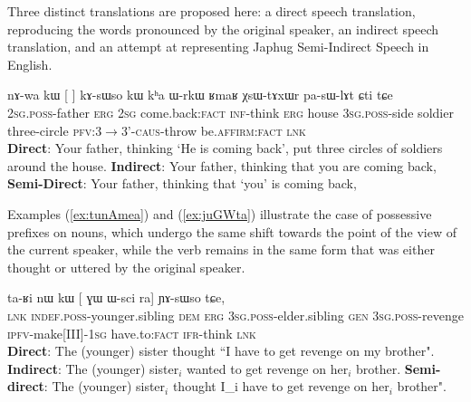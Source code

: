 \documentclass[oldfontcommands,oneside,a4paper,11pt]{article}
\newcommand{\ipa}[1]{{\phon \mbox{#1}}} %
\newcommand{\refb}[1]{(\ref{#1})}
\newcommand{\bleu}[1]{{\color{blue}#1}}
\newcommand{\rouge}[1]{{\color{red}#1}}
\begin{document}
Three distinct translations are proposed here: a direct speech translation, reproducing the words pronounced by the original speaker, an indirect speech translation, and an attempt at representing Japhug Semi-Indirect Speech in English.


\begin{exe}
\ex \label{ex:nWGi.kAsWso}
\gll 
\ipa{nɤ-wa}  	\ipa{kɯ}  	[\rouge{\ipa{nɤʑo}} 	\bleu{\ipa{nɯɣi}}]  	\ipa{kɤ-sɯso}  	\ipa{kɯ}  	\ipa{kʰa}  	\ipa{ɯ-rkɯ}  	\ipa{ʁmaʁ}  	\ipa{χsɯ-tɤxɯr}  	\ipa{pa-sɯ-lɤt}  	\ipa{ɕti}  	\ipa{tɕe}  \\
\textsc{2sg.poss}-father \textsc{erg} \textsc{2sg} {come.back:\textsc{fact}}  \textsc{inf}-think \textsc{erg} house \textsc{3sg.poss}-side soldier three-circle \textsc{pfv:3$\rightarrow$3'-caus}-throw be.\textsc{affirm}:\textsc{fact} \textsc{lnk}\\
\glt \textbf{Direct}: Your father, thinking `\bleu{He is coming back}',   put three circles of soldiers around the house. 
\glt  \textbf{Indirect}: Your father, thinking that \rouge{you are coming back},
\glt  \textbf{Semi-Direct}: Your father, thinking that `\rouge{you}' \bleu{is coming back}, 
\end{exe}
   
Examples \refb{ex:tunAmea} and \refb{ex:juGWta} illustrate the case of possessive prefixes on nouns, which undergo the same shift towards the point of the view of the current speaker, while the verb remains in the same form that was either thought or uttered by the original speaker.

\begin{exe}
\ex \label{ex:tunAmea}
\gll  \ipa{tɕe}  	\ipa{ta-ʁi}  	\ipa{nɯ}  	\ipa{kɯ}  	[\rouge{\ipa{ɯ-pi}}  	\ipa{ɣɯ}  	\ipa{ɯ-sci}  	\bleu{\ipa{tu-nɤme-a}}  	\ipa{ra}] 	\ipa{ɲɤ-sɯso}  	\ipa{tɕe,}  	\\
\textsc{lnk}  \textsc{indef.poss}-younger.sibling \textsc{dem} \textsc{erg}  {\textsc{3sg.poss}-elder.sibling}  \textsc{gen} \textsc{3sg.poss}-revenge {\textsc{ipfv}-make[III]-\textsc{1sg}} have.to:\textsc{fact} \textsc{ifr}-think \textsc{lnk} \\
\glt  \textbf{Direct}: The (younger) sister thought ``\bleu{I have to get revenge} on {my brother}".
\glt  \textbf{Indirect}:  The (younger) sister$_i$ \rouge{wanted to get revenge on her$_i$ brother}.
\glt  \textbf{Semi-direct}:  The (younger) sister$_i$ thought \bleu{I_i have to get revenge} on \rouge{her$_i$ brother}".
  \end{exe}
  
\end{document}
